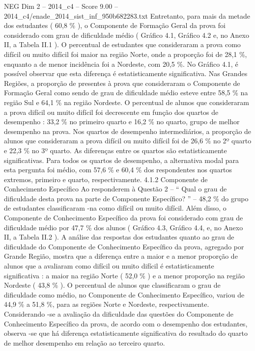\begin{textsample}{NEG Dim 2 – 2014\_c4 – Score 9.00 – 2014\_c4/enade\_2014\_sist\_inf\_950b682283.txt}
Entretanto, para mais da metade dos estudantes ( 60,8 \% ), o Componente de Formação Geral da prova foi considerado com grau de dificuldade médio ( Gráfico 4.1, Gráfico 4.2 e, no Anexo II, a Tabela II.1 ).
O percentual de estudantes que consideraram a prova como difícil ou muito difícil foi maior na região Norte, onde a proporção foi de 28,1 \%, enquanto a de menor incidência foi a Nordeste, com 20,5 \%.
No Gráfico 4.1, é possível observar que esta diferença é estatisticamente significativa.
Nas Grandes Regiões, a proporção de presentes à prova que consideraram o Componente de Formação Geral como sendo de grau de dificuldade médio esteve entre 58,5 \% na região Sul e 64,1 \% na região Nordeste.
O percentual de alunos que consideraram a prova difícil ou muito difícil foi decrescente em função dos quartos de desempenho : 33,2 \% no primeiro quarto e 16,2 \% no quarto, grupo de melhor desempenho na prova.
Nos quartos de desempenho intermediários, a proporção de alunos que consideraram a prova difícil ou muito difícil foi de 26,6 \% no 2º quarto e 22,3 \% no 3º quarto.
As diferenças entre os quartos são estatisticamente significativas.
Para todos os quartos de desempenho, a alternativa modal para esta pergunta foi médio, com 57,6 \% e 60,4 \% dos respondentes nos quartos extremos, primeiro e quarto, respectivamente. 4.1.2 Componente de Conhecimento Específico Ao responderem à Questão 2 – “ Qual o grau de dificuldade desta prova na parte de Componente Específico? ” – 48,2 \% do grupo de estudantes classificaram -na como difícil ou muito difícil.
Além disso, o Componente de Conhecimento Específico da prova foi considerado com grau de dificuldade médio por 47,7 \% dos alunos ( Gráfico 4.3, Gráfico 4.4, e, no Anexo II, a Tabela II.2 ).
A análise das respostas dos estudantes quanto ao grau de dificuldade do Componente de Conhecimento Específico da prova, agregado por Grande Região, mostra que a diferença entre a maior e a menor proporção de alunos que a avaliaram como difícil ou muito difícil é estatisticamente significativa : a maior na região Norte ( 52,0 \% ) e a menor proporção na região Nordeste ( 43,8 \% ).
O percentual de alunos que classificaram o grau de dificuldade como médio, no Componente de Conhecimento Específico, variou de 44,9 \% a 51,8 \%, para as regiões Norte e Nordeste, respectivamente.
Considerando -se a avaliação da dificuldade das questões do Componente de Conhecimento Específico da prova, de acordo com o desempenho dos estudantes, observa -se que há diferença estatisticamente significativa do resultado do quarto de melhor desempenho em relação ao terceiro quarto.

\end{textsample}
